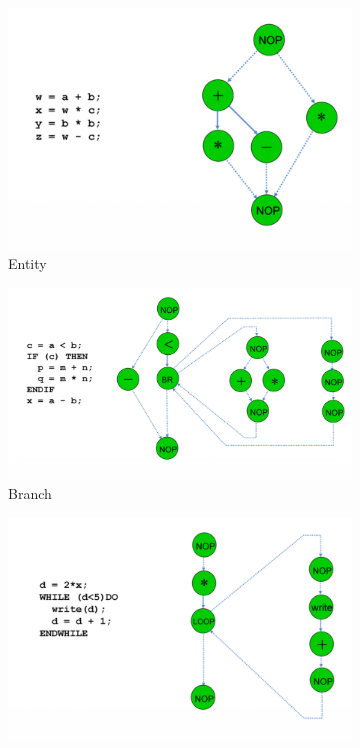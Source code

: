 \begin{figure}[h]
	\begin{center}
	\begin{subfigure}[b]{0.40\textwidth}
		\includegraphics[width=\textwidth]{images/SG_entity.png}
		\caption{Entity}
		\label{fig:SG_entity}
	\end{subfigure}
	\hfill
	\begin{subfigure}[b]{0.50\textwidth}
		\includegraphics[width=\textwidth]{images/SG_branch.png}
		\caption{Branch}
		\label{fig:SG_branch}
	\end{subfigure}
	\begin{subfigure}[b]{0.4\textwidth}
		\includegraphics[width=\textwidth]{images/SG_loop.png}

\end{subfigure}
\end{center}
\end{figure}
